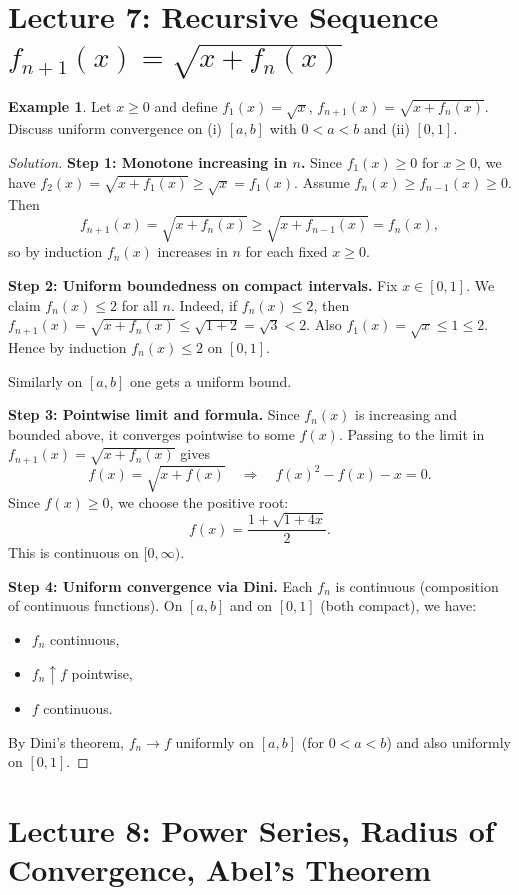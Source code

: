 \documentclass[12pt]{article}
\theoremstyle{definition}
\newtheorem{example}[theorem]{Example}
\begin{document}
\section{Lecture 7: Recursive Sequence $f_{n+1}(x)=\sqrt{x+f_n(x)}$}

\begin{example}
Let $x\ge 0$ and define $f_1(x)=\sqrt{x}$, $f_{n+1}(x)=\sqrt{x+f_n(x)}$.
Discuss uniform convergence on (i) $[a,b]$ with $0<a<b$ and (ii) $[0,1]$.
\end{example}

\begin{proof}[Solution]
\textbf{Step 1: Monotone increasing in $n$.}
Since $f_1(x)\ge 0$ for $x\ge 0$, we have $f_2(x)=\sqrt{x+f_1(x)}\ge \sqrt{x}=f_1(x)$.
Assume $f_n(x)\ge f_{n-1}(x)\ge 0$. Then
\[
f_{n+1}(x)=\sqrt{x+f_n(x)} \ge \sqrt{x+f_{n-1}(x)}=f_n(x),
\]
so by induction $f_n(x)$ increases in $n$ for each fixed $x\ge 0$.

\textbf{Step 2: Uniform boundedness on compact intervals.}
Fix $x\in[0,1]$. We claim $f_n(x)\le 2$ for all $n$.
Indeed, if $f_n(x)\le 2$, then $f_{n+1}(x)=\sqrt{x+f_n(x)}\le \sqrt{1+2}=\sqrt{3}<2$.
Also $f_1(x)=\sqrt{x}\le 1\le 2$. Hence by induction $f_n(x)\le 2$ on $[0,1]$.

Similarly on $[a,b]$ one gets a uniform bound.

\textbf{Step 3: Pointwise limit and formula.}
Since $f_n(x)$ is increasing and bounded above, it converges pointwise to some $f(x)$.
Passing to the limit in $f_{n+1}(x)=\sqrt{x+f_n(x)}$ gives
\[
f(x)=\sqrt{x+f(x)} \quad\Rightarrow\quad f(x)^2-f(x)-x=0.
\]
Since $f(x)\ge 0$, we choose the positive root:
\[
f(x)=\frac{1+\sqrt{1+4x}}{2}.
\]
This is continuous on $[0,\infty)$.

\textbf{Step 4: Uniform convergence via Dini.}
Each $f_n$ is continuous (composition of continuous functions).
On $[a,b]$ and on $[0,1]$ (both compact), we have:
\begin{itemize}
\item $f_n$ continuous,
\item $f_n\uparrow f$ pointwise,
\item $f$ continuous.
\end{itemize}
By Dini's theorem, $f_n\to f$ uniformly on $[a,b]$ (for $0<a<b$) and also uniformly on $[0,1]$.
\end{proof}

\section{Lecture 8: Power Series, Radius of Convergence, Abel's Theorem}
\end{document}
